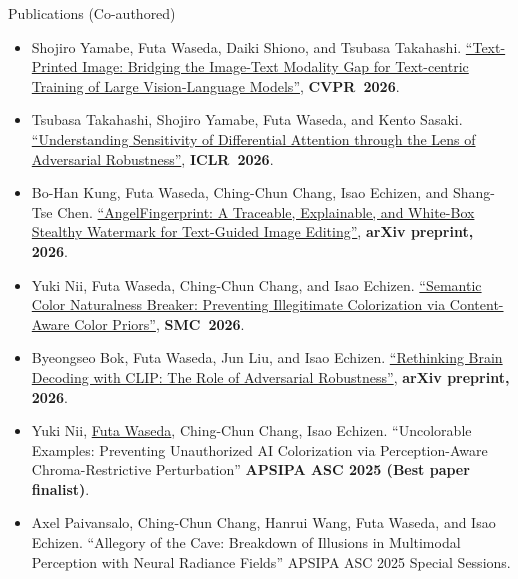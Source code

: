 \documentclass[]{mcdowellcv}
\begin{document}
\begin{cvsection}{Publications (Co-authored)}
    \begin{cvsubsection}{}{}{}
      \begin{itemize}
            \item Shojiro Yamabe, Futa Waseda, Daiki Shiono, and Tsubasa Takahashi. \href{https://openaccess.thecvf.com/content/CVPR2026/html/Yamabe_Text-Printed_Image_Bridging_the_Image-Text_Modality_Gap_for_Text-centric_Training_CVPR_2026_paper.html}{``Text-Printed Image: Bridging the Image-Text Modality Gap for Text-centric Training of Large Vision-Language Models''}, \textbf{CVPR~2026}.
            \item Tsubasa Takahashi, Shojiro Yamabe, Futa Waseda, and Kento Sasaki. \href{https://arxiv.org/abs/2510.00517}{``Understanding Sensitivity of Differential Attention through the Lens of Adversarial Robustness''}, \textbf{ICLR~2026}.
            \item Bo-Han Kung, Futa Waseda, Ching-Chun Chang, Isao Echizen, and Shang-Tse Chen. \href{https://arxiv.org/abs/2609.04709}{``AngelFingerprint: A Traceable, Explainable, and White-Box Stealthy Watermark for Text-Guided Image Editing''}, \textbf{arXiv preprint, 2026}.
            \item Yuki Nii, Futa Waseda, Ching-Chun Chang, and Isao Echizen. \href{https://arxiv.org/abs/2607.17610}{``Semantic Color Naturalness Breaker: Preventing Illegitimate Colorization via Content-Aware Color Priors''}, \textbf{SMC~2026}.
            \item Byeongseo Bok, Futa Waseda, Jun Liu, and Isao Echizen. \href{https://arxiv.org/abs/2607.03165}{``Rethinking Brain Decoding with CLIP: The Role of Adversarial Robustness''}, \textbf{arXiv preprint, 2026}.
            \item Yuki Nii, \ul{Futa Waseda}, Ching-Chun Chang, Isao Echizen. ``Uncolorable Examples: Preventing Unauthorized AI Colorization via Perception-Aware Chroma-Restrictive Perturbation''
            \textbf{APSIPA ASC 2025 (Best paper finalist)}.
            \item Axel Paivansalo, Ching-Chun Chang, Hanrui Wang, Futa Waseda, and Isao Echizen. ``Allegory of the Cave: Breakdown of Illusions in Multimodal Perception with Neural Radiance Fields'' APSIPA ASC 2025 Special Sessions.
        \end{itemize}
    \end{cvsubsection}
\end{cvsection}

\end{document}
